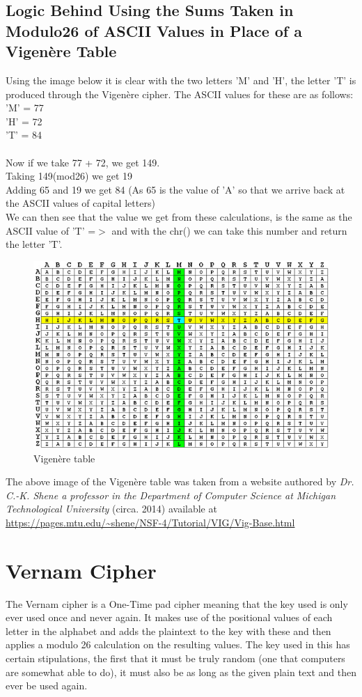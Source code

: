 \documentclass[a4paper, 12pt, titlepage]{report}
\begin{document}
\subsection{Logic Behind Using the Sums Taken in Modulo26 of ASCII Values in Place of a Vigenère Table}
Using the image below it is clear with the two letters 'M' and 'H', the letter 'T' is produced through the Vigenère cipher. The ASCII values for these are as follows:\\
'M' = 77\\
'H' = 72\\
'T' = 84\\\\
Now if we take 77 + 72, we get 149.\\
Taking 149(mod26) we get 19\\
Adding 65 and 19 we get 84 (As 65 is the value of 'A' so that we arrive back at the ASCII values of capital letters)\\
We can then see that the value we get from these calculations, is the same as the ASCII value of 'T' =$>$ and with the chr() we can take this number and return the letter 'T'.
\begin{figure}[H]
\centering
\includegraphics[scale=0.6]{./pics/vig}
\caption{Vigenère table}
\end{figure}
The above image of the Vigenère table was taken from a website authored by \textsl{Dr. C.-K. Shene a professor in the Department of Computer Science at Michigan Technological University} (circa. 2014) available at \url{https://pages.mtu.edu/~shene/NSF-4/Tutorial/VIG/Vig-Base.html}
\section{Vernam Cipher}
The Vernam cipher is a One-Time pad cipher meaning that the key used is only ever used once and never again. It makes use of the positional values of each letter in the alphabet and adds the plaintext to the key with these and then applies a modulo 26 calculation on the resulting values. The key used in this has certain stipulations, the first that it must be truly random (one that computers are somewhat able to do), it must also be as long as the given plain text and then ever be used again.
\end{document}
